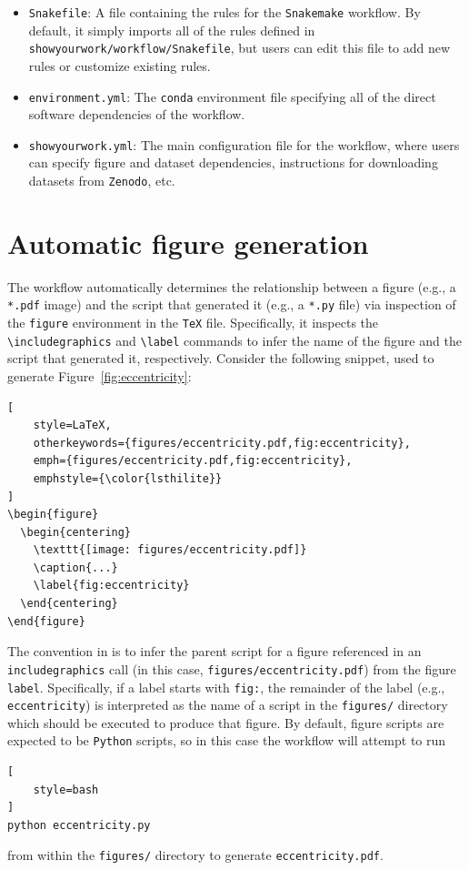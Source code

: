 \documentclass[twocolumn]{aastex631}
\begin{document}
\begin{itemize}
    \item \texttt{Snakefile}: A file containing the rules for the \texttt{Snakemake} workflow.
    By default, it simply imports all of the rules defined in \texttt{showyourwork/workflow/Snakefile}, but users can edit this file to add new rules or customize existing rules.
    \item \texttt{environment.yml}: The \texttt{conda} environment file specifying all of the direct software dependencies of the workflow.
    \item \texttt{showyourwork.yml}: The main configuration file for the workflow, where users can specify figure and dataset dependencies, instructions for downloading datasets from \texttt{Zenodo}, etc.
\end{itemize}

\section{Automatic figure generation}
\label{sec:auto-fig}
%
The workflow automatically determines the relationship between a figure (e.g., a \texttt{*.pdf} image) and the script that generated it (e.g., a \texttt{*.py} file) via inspection of the \texttt{figure} environment in the \texttt{TeX} file. 
Specifically, it inspects the \texttt{{\textbackslash}includegraphics} and \texttt{{\textbackslash}label} commands to infer the name of the figure and the script that generated it, respectively.
Consider the following snippet, used to generate Figure~\ref{fig:eccentricity}:
%
\begin{lstlisting}[
    style=LaTeX,
    otherkeywords={figures/eccentricity.pdf,fig:eccentricity},
    emph={figures/eccentricity.pdf,fig:eccentricity},
    emphstyle={\color{lsthilite}}
]
\begin{figure}
  \begin{centering}
    \texttt{[image: figures/eccentricity.pdf]}
    \caption{...}
    \label{fig:eccentricity}
  \end{centering}
\end{figure}
\end{lstlisting}
%
The convention in \showyourwork is to infer the parent script for a figure referenced in an \texttt{includegraphics} call (in this case, {\color{lsthilite}\texttt{figures/eccentricity.pdf}}) from the figure \texttt{label}. 
Specifically, if a label starts with {\color{lsthilite}\texttt{fig:}}, the remainder of the label (e.g., {\color{lsthilite}\texttt{eccentricity}}) is interpreted as the name of a script in the \texttt{figures/} directory which should be executed to produce that figure. 
By default, figure scripts are expected to be \texttt{Python} scripts, so in this case the workflow will attempt to run
%
\begin{lstlisting}[
    style=bash
]
python eccentricity.py
\end{lstlisting}
%
from within the \texttt{figures/} directory to generate \texttt{eccentricity.pdf}.
\end{document}
